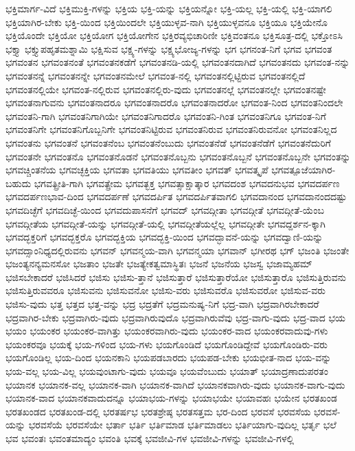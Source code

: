 {ಭಕ್ತಿಮಾರ್ಗ-ವಿದೆ
ಭಕ್ತಿಮುಕ್ತಿ-ಗಳನ್ನು
ಭಕ್ತಿಯ
ಭಕ್ತಿ-ಯನ್ನು
ಭಕ್ತಿಯನ್ನೋ
ಭಕ್ತಿ-ಯಲ್ಲ
ಭಕ್ತಿ-ಯಲ್ಲಿ
ಭಕ್ತಿ-ಯಾಗಲಿ
ಭಕ್ತಿಯಾಗಿರ-ಬೇಕು
ಭಕ್ತಿ-ಯಿಂದ
ಭಕ್ತಿಯಿಂದಲೇ
ಭಕ್ತಿಯುಳ್ಳವ-ನಾಗಿ
ಭಕ್ತಿಯುಳ್ಳವನೂ
ಭಕ್ತಿಯೂ
ಭಕ್ತಿಯೇನೊ
ಭಕ್ತಿಯೊಂದೇ
ಭಕ್ತಿಯೋ
ಭಕ್ತಿಯೋಗ
ಭಕ್ತಿಯೋಗೇನ
ಭಕ್ತಿರವ್ಯಭಿಚಾರಿಣೀ
ಭಕ್ತಿವಂತನೂ
ಭಕ್ತಿಸೂತ್ರ-ದಲ್ಲಿ
ಭಕ್ತೋಽಸಿ
ಭಕ್ತ್ಯಾ
ಭಕ್ತ್ಯುಪಹೃತಮಶ್ನಾಮಿ
ಭಕ್ಷಿಸುವ
ಭಕ್ಷ್ಯ-ಗಳನ್ನು
ಭಕ್ಷ್ಯಭೋಜ್ಯ-ಗಳನ್ನು
ಭಗ
ಭಗನಂತ-ನಿಗೆ
ಭಗವ
ಭಗವಂತ
ಭಗವಂತನ
ಭಗವಂತನಂತೆ
ಭಗವಂತನಕಡೆಗೆ
ಭಗವಂತನಡಿ-ಯಲ್ಲಿ
ಭಗವಂತನದಾಗಿದೆ
ಭಗವಂತನದು
ಭಗವಂತ-ನನ್ನು
ಭಗವಂತನನ್ನೆ
ಭಗವಂತನನ್ನೇ
ಭಗವಂತನಮೇಲೆ
ಭಗವಂತ-ನಲ್ಲಿ
ಭಗವಂತನಲ್ಲಿಟ್ಟಿರುವ
ಭಗವಂತನಲ್ಲಿದೆ
ಭಗವಂತನಲ್ಲಿಯೇ
ಭಗವಂತ-ನಲ್ಲಿರುವ
ಭಗವಂತನಲ್ಲಿರು-ವುದು
ಭಗವಂತನಲ್ಲೆ
ಭಗವಂತನಲ್ಲೇ
ಭಗವಂತನಷ್ಟೇ
ಭಗವಂತನಾಗುವನು
ಭಗವಂತನಾದರೂ
ಭಗವಂತನಾದರೊ
ಭಗವಂತನಾದರೋ
ಭಗವಂತ-ನಿಂದ
ಭಗವಂತನಿಂದಲೇ
ಭಗವಂತನಿ-ಗಾಗಿ
ಭಗವಂತನಿಗಾಗಿಯೇ
ಭಗವಂತನಿಗಾದರೊ
ಭಗವಂತನಿ-ಗಿಂತ
ಭಗವಂತನಿಗೂ
ಭಗವಂತ-ನಿಗೆ
ಭಗವಂತನಿಗೇ
ಭಗವಂತನಿಗೊಬ್ಬನಿಗೇ
ಭಗವಂತನಿಟ್ಟಿರುವ
ಭಗವಂತನಿರುವ
ಭಗವಂತನಿರುವನೋ
ಭಗವಂತನಿಲ್ಲದ
ಭಗವಂತನು
ಭಗವಂತನೆ
ಭಗವಂತನೆಂಬ
ಭಗವಂತನೆಂಬುದು
ಭಗವಂತನೆಡೆ
ಭಗವಂತನೆಡೆಗೆ
ಭಗವಂತನೆದುರಿಗೆ
ಭಗವಂತನೇ
ಭಗವಂತನೊ
ಭಗವಂತನೊಡನೆ
ಭಗವಂತನೊಬ್ಬನು
ಭಗವಂತನೊಬ್ಬನೆ
ಭಗವಂತನೊಬ್ಬನೇ
ಭಗವಂತನ್ನು
ಭಗವಚ್ಚಿಂತನೆಯ
ಭಗವಚ್ಛಕ್ತಿಯ
ಭಗವತಾ
ಭಗವತಿಯು
ಭಗವತೀಂ
ಭಗವತ್
ಭಗವತ್ಕೃಪೆ
ಭಗವತ್ಪೂಜೆಯಾಗಿರ-ಬಹುದು
ಭಗವತ್ಪ್ರೀತಿ-ಗಾಗಿ
ಭಗವತ್ಪ್ರೇಮ
ಭಗವತ್ಭಕ್ತ
ಭಗವತ್ಸಾಕ್ಷಾತ್ಕಾರ
ಭಗವದಂಶ
ಭಗವದನುಭವ
ಭಗವದರ್ಪಣ
ಭಗವದರ್ಪಣಭಾವ-ದಿಂದ
ಭಗವದರ್ಪಣೆ
ಭಗವದರ್ಪಿತ
ಭಗವದರ್ಪಿತವಾಗಲಿ
ಭಗವದಾನಂದ
ಭಗವದಾನಂದದಷ್ಟು
ಭಗವದಿಚ್ಛೆಗೆ
ಭಗವದಿಚ್ಛೆ-ಯಿಂದ
ಭಗವದುಪಾಸನೆಗೆ
ಭಗವದ್
ಭಗವದ್ಗೀತಾ
ಭಗವದ್ಗೀತೆ
ಭಗವದ್ಗೀತೆ-ಯೆಂಬ
ಭಗವದ್ಗೀತೆಯ
ಭಗವದ್ಗೀತೆ-ಯನ್ನು
ಭಗವದ್ಗೀತೆ-ಯಲ್ಲಿ
ಭಗವದ್ಗೀತೆಯಲ್ಲೆಲ್ಲ
ಭಗವದ್ಗೀತೇ
ಭಗವದ್ದರ್ಶನ-ಕ್ಕಾಗಿ
ಭಗವದ್ಭಕ್ತರಿಗೆ
ಭಗವದ್ಭಕ್ತರೊ
ಭಗವದ್ಭಕ್ತಿಯ
ಭಗವದ್ಭಕ್ತಿ-ಯಿಂದ
ಭಗವದ್ಭಾವನೆ-ಯನ್ನು
ಭಗವದ್ವಾಣಿ-ಯನ್ನು
ಭಗವದ್ಸಾಂನಿಧ್ಯದಲ್ಲಿರುವನು
ಭಗವನ್
ಭಗವನ್ಮಯ-ವಾಗಿ
ಭಗವನ್ಮಯಾ
ಭಗವಾನ್
ಭಗೀರಥ
ಭಗ್
ಭಜಂತಿ
ಭಜಂತೇ
ಭಜಂತ್ಯನನ್ಯಮನಸೋ
ಭಜತಾಂ
ಭಜತೇ
ಭಜತ್ಯೇಕತ್ವಮಾಸ್ಥಿತಃ
ಭಜನೆ
ಭಜನೆಯ
ಭಜಸ್ವ
ಭಜಾಮ್ಯಹಮ್
ಭಜಿಸಬೇಕಾದರೆ
ಭಜಿಸಿದರೆ
ಭಜಿಸು
ಭಜಿಸು-ತ್ತಾನೆ
ಭಜಿಸುತ್ತಾರೆ
ಭಜಿಸುತ್ತಾರೆಯೋ
ಭಜಿಸುತ್ತಾರೊ
ಭಜಿಸುತ್ತಿರುವನು
ಭಜಿಸುತ್ತಿರುವವರೂ
ಭಜಿಸುವನು
ಭಜಿಸುವನೋ
ಭಜಿಸು-ವರು
ಭಜಿಸುವರೊ
ಭಜಿಸುವರೋ
ಭಜಿಸುವ-ವರು
ಭಜಿಸು-ವುದು
ಭತ್ತ
ಭತ್ತದ
ಭತ್ತ-ವನ್ನು
ಭದ್ರ
ಭದ್ರತೆಗೆ
ಭದ್ರಮನುಷ್ಯ-ನಿಗೆ
ಭದ್ರ-ವಾಗಿ
ಭದ್ರವಾಗಿರಬೇಕಾದರೆ
ಭದ್ರವಾಗಿರ-ಬೇಕು
ಭದ್ರವಾಗಿರು-ವುದು
ಭದ್ರವಾಗಿರುವುದೊ
ಭದ್ರವಾಗಿರುವೆವು
ಭದ್ರ-ವಾಗು-ವುದು
ಭದ್ರ-ವಾದ
ಭಯ
ಭಯಂ
ಭಯಂಕರ
ಭಯಂಕರ-ವಾಗಿತ್ತು
ಭಯಂಕರವಾಗಿರು-ವುದು
ಭಯಂಕರ-ವಾದ
ಭಯಂಕರವಾದುವು-ಗಳು
ಭಯಂಕರವೂ
ಭಯಕ್ಕೆ
ಭಯ-ಗಳಿಂದ
ಭಯ-ಗಳು
ಭಯಗೊಂಡಿದೆ
ಭಯಗೊಂಡಿದ್ದೇವೆ
ಭಯಗೊಂಡಿರು-ವರು
ಭಯಗೊಂಡಿಲ್ಲ
ಭಯ-ದಿಂದ
ಭಯನಕಾನಿ
ಭಯಪಡಬಾರದು
ಭಯಪಡ-ಬೇಕು
ಭಯಭೀತ-ನಾದ
ಭಯ-ವನ್ನು
ಭಯ-ವಲ್ಲ
ಭಯ-ವಿಲ್ಲ
ಭಯವುಂಟಾಗು-ವುದು
ಭಯವೂ
ಭಯವೆಂಬುದು
ಭಯಾತ್
ಭಯಾದ್ರಣಾದುಪರತಂ
ಭಯಾನಕ
ಭಯಾನಕ-ವಲ್ಲ
ಭಯಾನಕ-ವಾಗಿ
ಭಯಾನಕ-ವಾಗಿದೆ
ಭಯಾನಕವಾಗಿರು-ವುದು
ಭಯಾನಕ-ವಾಗು-ವುದು
ಭಯಾನಕ-ವಾದ
ಭಯಾನಕವಾದುದನ್ನೂ
ಭಯಾಭಯ-ಗಳನ್ನು
ಭಯಾಭಯೇ
ಭಯಾವಹಃ
ಭಯೇನ
ಭರತಖಂಡ
ಭರತಖಂಡದ
ಭರತಖಂಡ-ದಲ್ಲಿ
ಭರತರ್ಷಭ
ಭರತಶ್ರೇಷ್ಠ
ಭರತಸತ್ತಮ
ಭರ-ದಿಂದ
ಭರವಸೆ
ಭರವಸೆಯ
ಭರವಸೆ-ಯನ್ನು
ಭರವಸೆಯೆ
ಭರವಸೆಯೇ
ಭರ್ತಾ
ಭರ್ತಿ
ಭರ್ತಿಮಾಡ
ಭರ್ತಿಮಾಡಲು
ಭರ್ತಿಯಾಗು-ವುದಿಲ್ಲ
ಭರ್ತೃ
ಭಲೆ
ಭವ
ಭವಂತಃ
ಭವಂತಮಾದ್ಯಂ
ಭವಂತಿ
ಭವಕ್ಕೆ
ಭವಜೀವಿ-ಗಳ
ಭವಜೀವಿ-ಗಳನ್ನು
ಭವಜೀವಿ-ಗಳಲ್ಲಿ
}
